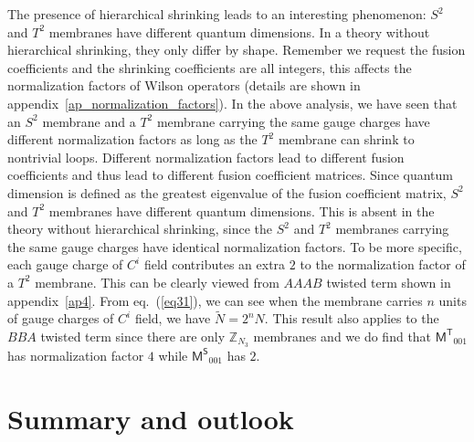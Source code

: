 \documentclass[11pt,nofootinbib,preprint]{revtex4-1}
\begin{document}
The presence of hierarchical shrinking leads to an interesting phenomenon: $S^2$ and $T^2$ membranes have different quantum dimensions. In a theory without hierarchical shrinking, they only differ by shape. Remember we request the fusion coefficients and the shrinking coefficients are all integers, this affects the normalization factors of Wilson operators (details are shown in appendix~\ref{ap_normalization_factors}). In the above analysis, we have seen that an $S^2$ membrane and a $T^2$ membrane carrying the same gauge charges have different normalization factors as long as the $T^2$ membrane can shrink to nontrivial loops. Different normalization factors lead to different fusion coefficients and thus lead to different fusion coefficient matrices. Since quantum dimension is defined as the greatest eigenvalue of the fusion coefficient matrix,  $S^2$ and $T^2$ membranes have different quantum dimensions. This is absent in the theory without hierarchical shrinking, since the $S^2$ and $T^2$ membranes carrying the same gauge charges have identical normalization factors. To be more specific, each gauge charge of $C^i$ field contributes an extra $2$ to the normalization factor of a $T^2$ membrane. This can be clearly viewed from $AAAB$ twisted term shown in appendix~\ref{ap4}. From eq.~(\ref{eq31}), we can see when the membrane carries $n$ units of gauge charges of $C^i$ field, we have $\tilde{N}=2^nN$. This result also applies to the $BBA$ twisted term since there are only $\mathbb{Z}_{N_3}$ membranes and we do find that $\mathsf{M^T}_{001}$ has normalization factor $4$ while $\mathsf{M^S}_{001}$ has $2$. 



\section{Summary and outlook}\label{section_summary}
\end{document}
